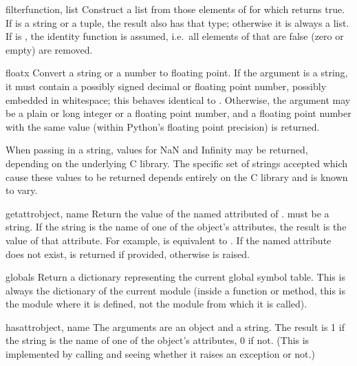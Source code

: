 \begin{funcdesc}{filter}{function, list}
Construct a list from those elements of  for which
 returns true.  If  is a string or a tuple,
the result also has that type; otherwise it is always a list.  If
 is , the identity function is assumed,
i.e.\ all elements of  that are false (zero or empty) are
removed.
\end{funcdesc}

\begin{funcdesc}{float}{x}
  Convert a string or a number to floating point.  If the argument is a
  string, it must contain a possibly signed decimal or floating point
  number, possibly embedded in whitespace; this behaves identical to
  .  Otherwise, the argument may be a plain
  or long integer or a floating point number, and a floating point
  number with the same value (within Python's floating point
  precision) is returned.

   When passing in a string, values for NaN
  and Infinity may be returned, depending on the
  underlying C library.  The specific set of strings accepted which
  cause these values to be returned depends entirely on the C library
  and is known to vary.
\end{funcdesc}

\begin{funcdesc}{getattr}{object, name}
  Return the value of the named attributed of .  
  must be a string.  If the string is the name of one of the object's
  attributes, the result is the value of that attribute.  For example,
   is equivalent to .  If the
  named attribute does not exist,  is returned if provided,
  otherwise  is raised.
\end{funcdesc}

\begin{funcdesc}{globals}{}
Return a dictionary representing the current global symbol table.
This is always the dictionary of the current module (inside a
function or method, this is the module where it is defined, not the
module from which it is called).
\end{funcdesc}

\begin{funcdesc}{hasattr}{object, name}
  The arguments are an object and a string.  The result is 1 if the
  string is the name of one of the object's attributes, 0 if not.
  (This is implemented by calling  and seeing whether it raises an exception or not.)
\end{funcdesc}

